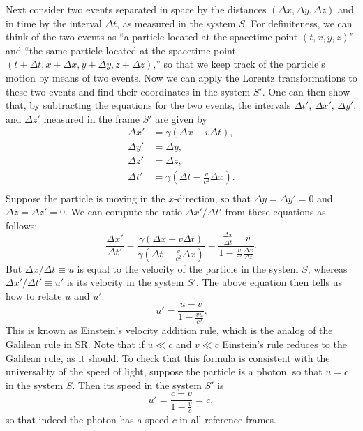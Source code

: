 Next consider two events separated in space by the distances $(\Delta x,\Delta y,\Delta z)$ and in time by the interval $\Delta t$, as measured in the system $S$. For definiteness, we can think of the two events as ``a particle located at the spacetime point $(t,x,y,z)$'' and ``the same particle located at the spacetime point $(t+\Delta t,x+\Delta x,y+\Delta y,z+\Delta z)$,'' so that we keep track of the particle's motion by means of two events. Now we can apply the Lorentz transformations to these two events and find their coordinates in the system $S'$. One can then show that, by subtracting the equations for the two events, the intervals $\Delta t'$, $\Delta x'$, $\Delta y'$, and $\Delta z'$ measured in the frame $S'$ are given by
\begin{equation} \label{eq:lorentz_intervals}
\begin{split}
\Delta x'&=\gamma\left(\Delta x-v\Delta t\right),\\
\Delta y'&=\Delta y,\\
\Delta z'&=\Delta z,\\
\Delta t'&=\gamma\left(\Delta t-\frac{v}{c^2}\Delta x\right).\\
\end{split}
\end{equation}
Suppose the particle is moving in the $x$-direction, so that $\Delta y=\Delta y'=0$ and $\Delta z=\Delta z'=0$. We can compute the ratio $\Delta x'/\Delta  t'$ from these equations as follows:
\begin{equation}
\frac{\Delta x'}{\Delta t'}=\frac{\gamma\left(\Delta x-v\Delta t\right)}{\gamma\left(\Delta t-\frac{v}{c^2}\Delta x\right)}=\frac{\frac{\Delta x}{\Delta t}-v}{1-\frac{v}{c^2}\frac{\Delta x}{\Delta t}}.
\end{equation}
But $\Delta x/\Delta t\equiv u$ is equal to the velocity of the particle in the system $S$, whereas $\Delta x'/\Delta t'\equiv u'$ is its velocity in the system $S'$. The above equation then tells us how to relate $u$ and $u'$:
\begin{equation} \label{eq:einstein_vel_rule}
u'=\frac{u-v}{1-\frac{vu}{c^2}}.
\end{equation}
This is known as Einstein's velocity addition rule, which is the analog of the Galilean rule in SR. Note that if $u\ll c$ and $v\ll c$ Einstein's rule reduces to the Galilean rule, as it should. To check that this formula is consistent with the universality of the speed of light, suppose the particle is a photon, so that $u=c$ in the system $S$. Then its speed in the system $S'$ is
\begin{equation}
u'=\frac{c-v}{1-\frac{v}{c}}=c,
\end{equation}
so that indeed the photon has a speed $c$ in all reference frames.


